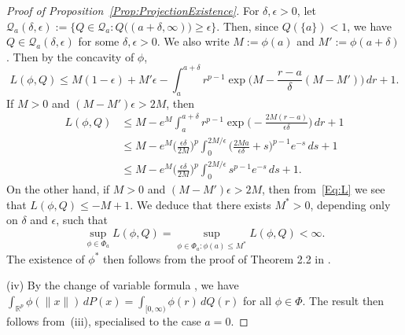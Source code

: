 \documentclass[a4paper,12pt]{article}
\begin{document}
\begin{proof}[Proof of Proposition~\ref{Prop:ProjectionExistence}]
For $\delta, \epsilon > 0$, let $\mathcal{Q}_a(\delta,\epsilon) := \bigl\{Q \in \mathcal{Q}_a:Q\bigl((a+\delta,\infty)\bigr) \geq \epsilon\bigr\}$.  Then, since $Q(\{a\}) < 1$, we have $Q \in \mathcal{Q}_a(\delta,\epsilon)$ for some $\delta,\epsilon > 0$.
We also write $M := \phi(a)$ and $M' := \phi(a+\delta)$. Then 
by the concavity of $\phi$,
\begin{equation}
\label{Eq:L}
L(\phi, Q) \leq M (1-\epsilon) + M'\epsilon - \int_{a}^{a+\delta} r^{p-1} \exp \biggl(M - \frac{r - a}{\delta}(M - M') \biggr) \, dr + 1.
\end{equation}
If $M > 0$ and $(M - M')\epsilon > 2M$, then 
\begin{align*}
L(\phi, Q) &\leq M - e^M \int_{a}^{a+\delta} r^{p-1} \exp \biggl( - \frac{2M(r - a)}{\epsilon\delta} \biggr) \, dr + 1 \\
           &\leq M - e^M \biggl(\frac{\epsilon \delta}{2M} \biggr)^p \int_0^{2M/\epsilon} \biggl( \frac{2M a}{\epsilon\delta} + s \biggr)^{p-1}e^{-s}  \, ds + 1  \\
   &\leq M - e^M \biggl( \frac{\epsilon\delta}{2M} \biggr)^p \int_0^{2M/\epsilon} s^{p-1} e^{-s}  \, ds + 1. 
\end{align*}
On the other hand, if $M > 0$ and $(M - M')\epsilon > 2M$, then from~\eqref{Eq:L} we see that $L(\phi, Q) \leq -M+1$.  We deduce that there exists $M^*> 0$, depending only on $\delta$ and $\epsilon$, such that 
\[
  \sup_{\phi \in \Phi_{a}}L(\phi, Q) = \sup_{\phi \in \Phi_{a}:\phi(a) \leq M^*}L(\phi, Q) < \infty.
\]
The existence of $\phi^*$ then follows from the proof of Theorem 2.2 in \cite{dumbgen2011approximation}.

(iv) By the change of variable formula \citep[e.g.][Theorem~16.13]{billingsley1995probability}, we have $\int_{\mathbb{R}^p} \phi( \| x \|) \, dP(x) = \int_{[0,\infty)} \phi(r) \, dQ(r)$ for all $\phi \in \Phi$. The result then follows from~(iii), specialised to the case $a = 0$.
\end{proof}
\end{document}
